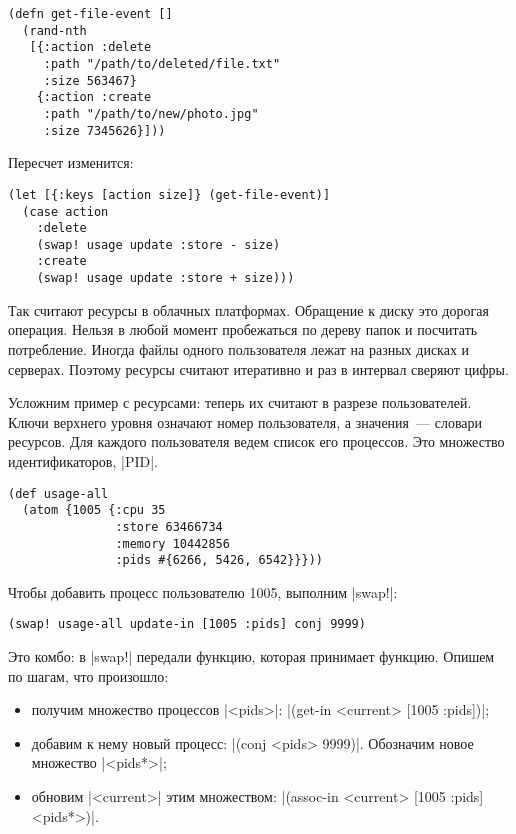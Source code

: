 \begin{verbatim}
(defn get-file-event []
  (rand-nth
   [{:action :delete
     :path "/path/to/deleted/file.txt"
     :size 563467}
    {:action :create
     :path "/path/to/new/photo.jpg"
     :size 7345626}]))
\end{verbatim}

\noindent
Пересчет изменится:

\begin{verbatim}
(let [{:keys [action size]} (get-file-event)]
  (case action
    :delete
    (swap! usage update :store - size)
    :create
    (swap! usage update :store + size)))
\end{verbatim}

Так считают ресурсы в облачных платформах. Обращение к диску это дорогая
операция. Нельзя в любой момент пробежаться по дереву папок и посчитать
потребление. Иногда файлы одного пользователя лежат на разных дисках и
серверах. Поэтому ресурсы считают итеративно и раз в интервал сверяют цифры.

Усложним пример с ресурсами: теперь их считают в разрезе пользователей. Ключи
верхнего уровня означают номер пользователя, а значения~--- словари
ресурсов. Для каждого пользователя ведем список его процессов. Это множество
идентификаторов, \spverb|PID|.

\begin{verbatim}
(def usage-all
  (atom {1005 {:cpu 35
               :store 63466734
               :memory 10442856
               :pids #{6266, 5426, 6542}}}))
\end{verbatim}

Чтобы добавить процесс пользователю 1005, выполним \spverb|swap!|:

\begin{verbatim}
(swap! usage-all update-in [1005 :pids] conj 9999)
\end{verbatim}

Это комбо: в \spverb|swap!| передали функцию, которая принимает функцию. Опишем
по шагам, что произошло:

\begin{itemize}

\item
  получим множество процессов \spverb|<pids>|: \spverb|(get-in <current> [1005 :pids])|;

\item
  добавим к нему новый процесс: \spverb|(conj <pids> 9999)|. Обозначим новое
  множество \spverb|<pids*>|;

\item
  обновим \spverb|<current>| этим множеством: \spverb|(assoc-in <current> [1005 :pids] <pids*>)|.

\end{itemize}

